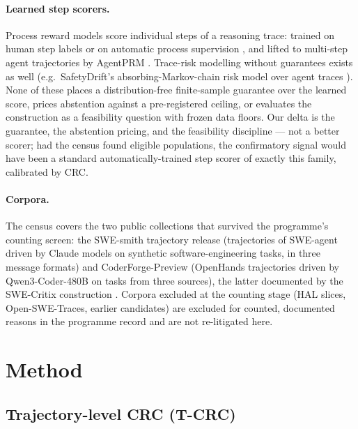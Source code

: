 \documentclass[11pt]{article}
\begin{document}
\paragraph{Learned step scorers.} Process reward models score
individual steps of a reasoning trace: trained on human step
labels \citep{lightman2023verify} or on automatic process
supervision \citep{wang2024mathshepherd}, and lifted to
multi-step agent trajectories by AgentPRM
\citep{xi2025agentprm}. Trace-risk modelling without guarantees
exists as well (e.g.\ SafetyDrift's absorbing-Markov-chain
risk model over agent traces \citep{dhodapkar2026safetydrift}). None of these places a distribution-free
finite-sample guarantee over the learned score, prices
abstention against a pre-registered ceiling, or evaluates the
construction as a feasibility question with frozen data floors.
Our delta is the guarantee, the abstention pricing, and the
feasibility discipline --- not a better scorer; had the census
found eligible populations, the confirmatory signal would have
been a standard automatically-trained step scorer of exactly
this family, calibrated by CRC.

\paragraph{Corpora.} The census covers the two public
collections that survived the programme's counting screen: the
SWE-smith trajectory release (trajectories of SWE-agent driven
by Claude models on synthetic software-engineering tasks, in
three message formats) and CoderForge-Preview (OpenHands
trajectories driven by Qwen3-Coder-480B on tasks from three
sources), the latter documented by the SWE-Critix construction
\citep{swecritix2026}. Corpora excluded at the counting stage
(HAL slices, Open-SWE-Traces, earlier candidates) are excluded
for counted, documented reasons in the programme record and are
not re-litigated here.

\section{Method}

\subsection{Trajectory-level CRC (T-CRC)}
\end{document}
